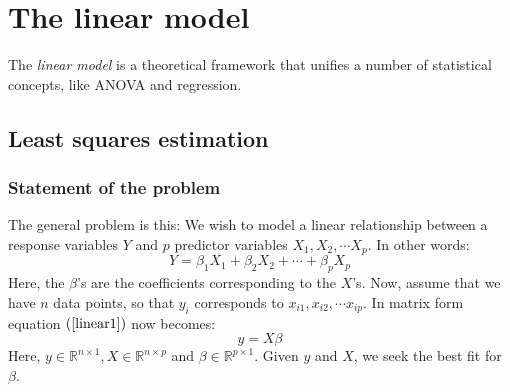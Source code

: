 \documentclass[12pt, a4paper]{article}
\begin{document}
\section{The linear model}
The \textit{linear model} is a theoretical framework that unifies a number of statistical concepts, like ANOVA and regression.

\subsection{Least squares estimation}

\subsubsection{Statement of the problem}
The general problem is this: We wish to model a linear relationship between a response variables $Y$ and $p$ predictor variables $X_1, X_2,\cdots X_p$. In other words:
\begin{equation}
\label{linear1}
Y=\beta_1 X_1 + \beta_2 X_2 + \cdots + \beta_p X_p
\end{equation}
Here, the $\beta$'s are the coefficients corresponding to the $X$'s. Now, assume that we have $n$ data points, so that $y_i$ corresponds to $x_{i1}, x_{i2},\cdots x_{ip}$. In matrix form equation $(\ref{linear1})$ now becomes: 
\begin{equation}
y=X\beta
\end{equation}
Here, $y\in\mathbb{R}^{n\times 1}, X\in\mathbb{R}^{n\times p}$ and $\beta\in\mathbb{R}^{p\times 1}$. Given $y$ and $X$, we seek the best fit for $\beta$.



\end{document}
